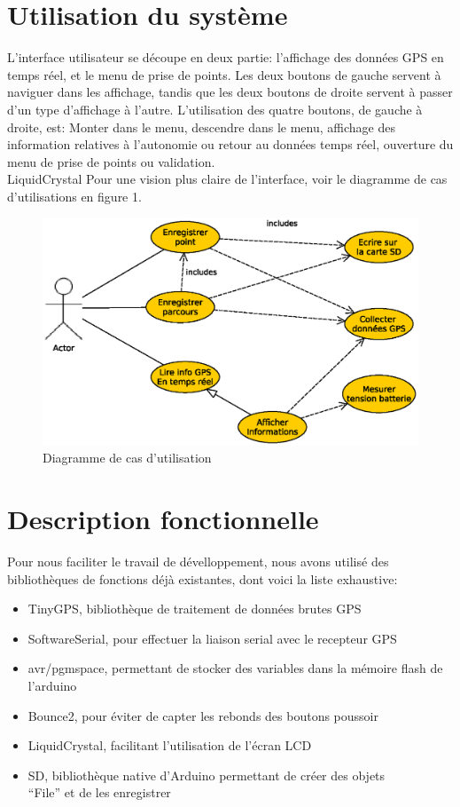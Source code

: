 \documentclass[a4paper,12pt]{article}
\begin{document}
\section{Utilisation du système}
L'interface utilisateur se découpe en deux partie: l'affichage des données GPS en temps réel, et le menu de prise de points. Les deux boutons de gauche servent à naviguer dans les affichage, tandis que les deux boutons de droite servent à passer d'un type d'affichage à l'autre. L'utilisation des quatre boutons, de gauche à droite, est:\newline
Monter dans le menu, descendre dans le menu, affichage des information relatives à l'autonomie ou retour au données temps réel, ouverture du menu de prise de points ou validation. \\
LiquidCrystal
Pour une vision plus claire de l'interface, voir le diagramme de cas d'utilisations en figure 1.

\begin{figure}[!ht]
	\begin{center}
		
		\includegraphics[scale = 0.9]{UseCase.eps}
		\caption{Diagramme de cas d'utilisation}
	\end{center}
\end{figure}
\FloatBarrier
\newpage
\section{Description fonctionnelle}
Pour nous faciliter le travail de dévelloppement, nous avons utilisé des bibliothèques de fonctions déjà existantes, dont voici la liste exhaustive:
\begin{itemize}
\item TinyGPS, bibliothèque de traitement de données brutes GPS
\item SoftwareSerial, pour effectuer la liaison serial avec le recepteur GPS
\item avr/pgmspace, permettant de stocker des variables dans la mémoire flash de l'arduino
\item Bounce2, pour éviter de capter les rebonds des boutons poussoir
\item LiquidCrystal, facilitant l'utilisation de l'écran LCD
\item SD, bibliothèque native d'Arduino permettant de créer des objets\\ ``File'' et de les enregistrer
\end{itemize}
\end{document}
